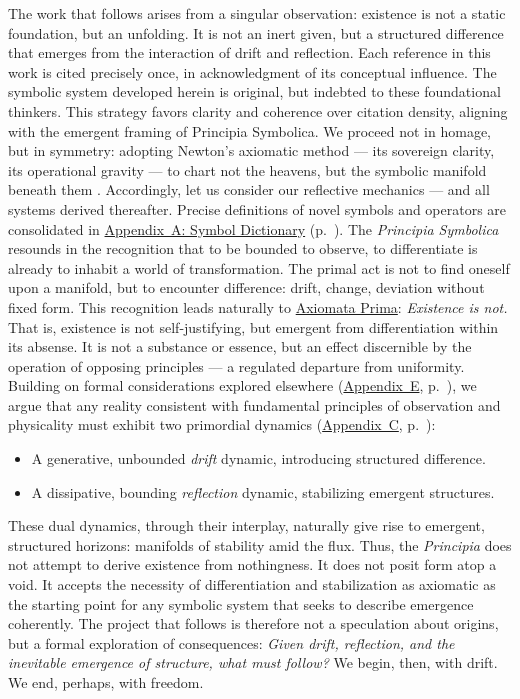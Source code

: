 The work that follows arises from a singular observation: existence is not a static foundation, but an unfolding. It is not an inert given, but a structured difference that emerges from the interaction of drift and reflection.  Each reference in this work is cited precisely once, in acknowledgment of its conceptual influence. The symbolic system developed herein is original, but indebted to these foundational thinkers. This strategy favors clarity and coherence over citation density, aligning with the emergent framing of Principia Symbolica.  We proceed not in homage, but in symmetry: adopting Newton's axiomatic method --- its sovereign clarity, its operational gravity --- to chart not the heavens, but the symbolic manifold beneath them \cite{newton1999principia}. Accordingly, let us consider our reflective mechanics --- and all systems derived thereafter.
Precise definitions of novel symbols and operators are consolidated in \hyperref[sec:appA_symbol_dictionary]{Appendix~A: Symbol Dictionary} (p.~\pageref{sec:appA_symbol_dictionary}).
The \emph{Principia Symbolica} resounds in the recognition that to be bounded \textemdash to observe, to differentiate \textemdash is already to inhabit a world of transformation. The primal act is not to find oneself upon a manifold, but to encounter difference: drift, change, deviation without fixed form.
This recognition leads naturally to \hyperref[sec:bk1_axiomata_prima]{Axiomata Prima}: \emph{Existence is not.} That is, existence is not self-justifying, but emergent from differentiation within its absense. It is not a substance or essence, but an effect discernible by the operation of opposing principles --- a regulated departure from uniformity.
Building on formal considerations explored elsewhere (\hyperref[sec:appE_directed_abstracts]{Appendix~E}, p.~\pageref{sec:appE_directed_abstracts}), we argue that any reality consistent with fundamental principles of observation and physicality must exhibit two primordial dynamics (\hyperref[sec:appC_dual_horizon]{Appendix~C}, p.~\pageref{sec:appC_dual_horizon}):
\begin{itemize}
    \item A generative, unbounded \emph{drift} dynamic, introducing structured difference.
    \item A dissipative, bounding \emph{reflection} dynamic, stabilizing emergent structures.
\end{itemize}
These dual dynamics, through their interplay, naturally give rise to emergent, structured horizons: manifolds of stability amid the flux.
Thus, the \emph{Principia} does not attempt to derive existence from nothingness. It does not posit form atop a void. It accepts the necessity of differentiation and stabilization as axiomatic \textemdash as the starting point for any symbolic system that seeks to describe emergence coherently.
The project that follows is therefore not a speculation about origins, but a formal exploration of consequences:
\emph{Given drift, reflection, and the inevitable emergence of structure, what must follow?}
We begin, then, with drift.
We end, perhaps, with freedom.


